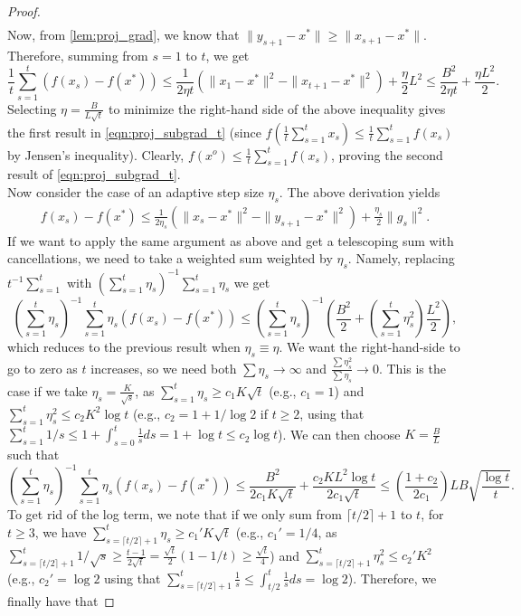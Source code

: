 \begin{theorem}
\begin{proof}
\begin{align*}
\end{align*}
Now, from \autoref{lem:proj_grad}, we know that $\| y_{s+1} - x^* \| \geq \|x_{s+1} - x^*\|$. Therefore, summing from $s = 1$ to $t$, we get
\[
\frac{1}{t} \sum_{s=1}^t (f(x_s) - f(x^*)) \leq \frac{1}{2 \eta t} \left( \| x_1 - x^* \|^2 - \| x_{t+1} - x^* \|^2 \right) + \frac{\eta}{2} L^2 \leq \frac{B^2}{2 \eta t} + \frac{\eta L^2 }{2}.
\]
Selecting $\eta = \frac{B}{L\sqrt{t}}$ to minimize the right-hand side of the above inequality gives the first result in \eqref{eqn:proj_subgrad_t} (since $f\left(\frac{1}{t}\sum_{s=1}^t x_s \right) \leq \frac{1}{t} \sum_{s=1}^t f(x_s)$ by Jensen's inequality). Clearly, $f(x^o) \leq \frac{1}{t} \sum_{s=1}^t f(x_s)$, proving the second result of \eqref{eqn:proj_subgrad_t}. \\

Now consider the case of an adaptive step size $\eta_s$. The above derivation yields
\begin{align*}
f(x_s) - f(x^*)
\le \frac{1}{2\eta_s} \left( \|x_s - x^*\|^2 - \|y_{s+1} - x^*\|^2 \right) + \frac{\eta_s}{2} \|g_s\|^2.
\end{align*}
If we want to apply the same argument as above and get a telescoping sum with cancellations, we need to take a weighted sum weighted by $\eta_s$. Namely, replacing $t^{-1}\sum_{s=1}^t$ with $(\sum_{s=1}^t \eta_s)^{-1} \sum_{s=1}^t \eta_s$ we get
\[
\left(\sum_{s=1}^t \eta_s\right)^{-1} \sum_{s=1}^t \eta_s \left(f(x_s) - f(x^*)\right) \leq \left(\sum_{s=1}^t \eta_s\right)^{-1} \left(\frac{B^2}{2} + \left(\sum_{s=1}^t \eta^2_s\right) \frac{L^2}{2}\right),
\]
which reduces to the previous result when $\eta_s\equiv\eta$.
We want the right-hand-side to go to zero as $t$ increases, so we need both $\sum \eta_s \rightarrow \infty$ and $\frac{\sum \eta_s^2}{\sum \eta_s} \rightarrow 0$. This is the case if we take $\eta_s = \frac{K}{\sqrt{s}}$, as $\sum_{s=1}^t \eta_s \geq c_1 K \sqrt{t}$ (e.g., $c_1=1$) and $\sum_{s=1}^t \eta_s^2 \leq c_2 K^2 \log t$ (e.g., $c_2=1+1/\log 2$ if $t\ge 2$, using that $\sum_{s=1}^t 1/s \le 1+\int_{s=0}^t \frac{1}{s} ds = 1+\log t \le c_2 \log t$). We can then choose $K = \frac{B}{L}$ such that 
\[
\left(\sum_{s=1}^t \eta_s\right)^{-1}\sum_{s=1}^t \eta_s \left(f(x_s) - f(x^*)\right)
\leq 
\frac{B^2}{2c_1 K \sqrt{t}} + \frac{c_2 K L^2 \log t}{2c_1\sqrt{t}}
\leq
\left( \frac{1+c_2}{2c_1} \right) LB \sqrt{\frac{\log t}{t}}.
\]
To get rid of the log term, we note that if we only sum from $\lceil t /2 \rceil + 1$ to $t$, for $t\ge 3$, we have $\sum_{s=\lceil t /2 \rceil + 1}^t \eta_s \geq c_1' K \sqrt{t}$ (e.g., $c_1'=1/4$, as $\sum_{s=\lceil t /2 \rceil + 1}^t 1/\sqrt{s} \ge \frac{t-1}{2\sqrt{t}} = \frac{\sqrt{t}}{2}(1-1/t)\ge \frac{\sqrt{t}}{4}$) and $\sum_{s=\lceil t /2 \rceil + 1}^t \eta_s^2 \leq c_2' K^2$ (e.g., $c_2'=\log 2$ using that $\sum_{s=\lceil t /2 \rceil + 1}^t \frac{1}{s} \leq \int_{t /2}^t \frac{1}{s} ds = \log 2$). Therefore, we finally have that 

\end{proof}
\end{theorem}
